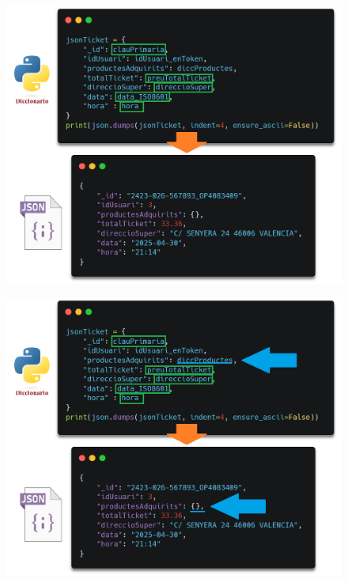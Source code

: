 \documentclass{beamer}
\begin{document}
		\begin{frame}
			\begin{figure}
				\centering
				\includegraphics[width=.8\linewidth]{imgEspecifiques/ticketExtraccioL.png}
				\label{fig:ticketExtraccioL}
			\end{figure}
		\end{frame}
		
		\begin{frame}
			\begin{figure}
				\centering
				\includegraphics[width=.8\linewidth]{imgEspecifiques/ticketExtraccioM.png}
				\label{fig:ticketExtraccioM}
			\end{figure}
		\end{frame}
	
	
	
	
	
	
\end{document}
